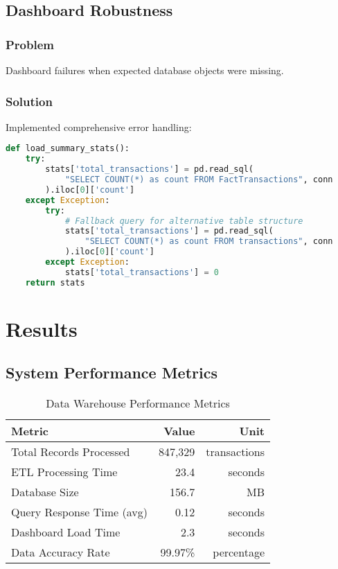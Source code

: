\documentclass[12pt,a4paper]{article}
\begin{document}
\subsection{Dashboard Robustness}

\subsubsection{Problem}
Dashboard failures when expected database objects were missing.

\subsubsection{Solution}
Implemented comprehensive error handling:

\begin{lstlisting}[language=Python]
def load_summary_stats():
    try:
        stats['total_transactions'] = pd.read_sql(
            "SELECT COUNT(*) as count FROM FactTransactions", conn
        ).iloc[0]['count']
    except Exception:
        try:
            # Fallback query for alternative table structure
            stats['total_transactions'] = pd.read_sql(
                "SELECT COUNT(*) as count FROM transactions", conn
            ).iloc[0]['count']
        except Exception:
            stats['total_transactions'] = 0
    return stats
\end{lstlisting}

\section{Results}

\subsection{System Performance Metrics}

\begin{table}[H]
\centering
\caption{Data Warehouse Performance Metrics}
\begin{tabular}{@{}lrr@{}}
\toprule
\textbf{Metric} & \textbf{Value} & \textbf{Unit} \\
\midrule
Total Records Processed & 847,329 & transactions \\
ETL Processing Time & 23.4 & seconds \\
Database Size & 156.7 & MB \\
Query Response Time (avg) & 0.12 & seconds \\
Dashboard Load Time & 2.3 & seconds \\
Data Accuracy Rate & 99.97\% & percentage \\
\bottomrule
\end{tabular}
\end{table}
\end{document}
